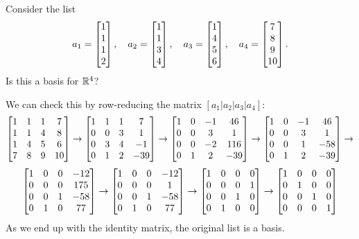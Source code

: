 \documentclass[a4paper]{amsart}
\renewenvironment{solution}{\SolutionInline}{\endSolutionInline}
\begin{document}
\begin{exercise}\label{ex-basis-ii}
 Consider the list 
 \[ 
  a_1 = \left[\begin{matrix} 1\\1\\1\\2 \end{matrix}\right], \quad
  a_2 = \left[\begin{matrix} 1\\1\\3\\4 \end{matrix}\right], \quad
  a_3 = \left[\begin{matrix} 1\\4\\5\\6 \end{matrix}\right], \quad
  a_4 = \left[\begin{matrix} 7\\8\\9\\10\end{matrix}\right].
 \]
 Is this a basis for ${\mathbb{R}}^4$?
\end{exercise}
\begin{solution}
 We can check this by row-reducing the matrix $[a_1|a_2|a_3|a_4]$:
 \[ 
  \left[\begin{matrix} 1 & 1 & 1 & 7 \\ 
       1 & 1 & 4 & 8 \\
       1 & 4 & 5 & 6 \\
       7 & 8 & 9 & 10 \end{matrix}\right] 
  \to 
  \left[\begin{matrix} 1 & 1 & 1 &   7 \\ 
       0 & 0 & 3 &   1 \\
       0 & 3 & 4 &  -1 \\
       0 & 1 & 2 & -39 \end{matrix}\right] 
  \to 
  \left[\begin{matrix} 1 & 0 &-1 &  46 \\ 
       0 & 0 & 3 &   1 \\
       0 & 0 &-2 & 116 \\
       0 & 1 & 2 & -39 \end{matrix}\right] 
  \to 
  \left[\begin{matrix} 1 & 0 &-1 &  46 \\ 
       0 & 0 & 3 &   1 \\
       0 & 0 & 1 & -58 \\
       0 & 1 & 2 & -39 \end{matrix}\right] 
  \to 
 \] \[
  \left[\begin{matrix} 1 & 0 & 0 & -12 \\ 
       0 & 0 & 0 & 175 \\
       0 & 0 & 1 & -58 \\
       0 & 1 & 0 &  77 \end{matrix}\right] 
  \to 
  \left[\begin{matrix} 1 & 0 & 0 & -12 \\ 
       0 & 0 & 0 &   1 \\
       0 & 0 & 1 & -58 \\
       0 & 1 & 0 &  77 \end{matrix}\right] 
  \to 
  \left[\begin{matrix} 1 & 0 & 0 &   0 \\ 
       0 & 0 & 0 &   1 \\
       0 & 0 & 1 &   0 \\
       0 & 1 & 0 &   0 \end{matrix}\right] 
  \to 
  \left[\begin{matrix} 1 & 0 & 0 &   0 \\ 
       0 & 1 & 0 &   0 \\
       0 & 0 & 1 &   0 \\
       0 & 0 & 0 &   1 \end{matrix}\right]
 \]
 As we end up with the identity matrix, the original list is a basis.
\end{solution}
\end{document}

